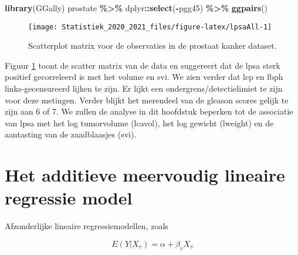 \documentclass[
  12pt,dutch,coursenotes]{book}
\newenvironment{Shaded}{\begin{snugshade}}{\end{snugshade}}
\newcommand{\KeywordTok}[1]{\textcolor[rgb]{0.13,0.29,0.53}{\textbf{#1}}}
\newcommand{\NormalTok}[1]{#1}
\newcommand{\OperatorTok}[1]{\textcolor[rgb]{0.81,0.36,0.00}{\textbf{#1}}}
\newcommand{\StringTok}[1]{\textcolor[rgb]{0.31,0.60,0.02}{#1}}
\theoremstyle{definition}
\theoremstyle{definition}
\theoremstyle{definition}
\theoremstyle{remark}
\begin{document}
\begin{Shaded}
\end{Shaded}

\begin{Shaded}
\begin{Highlighting}[]
\KeywordTok{library}\NormalTok{(GGally)}
\NormalTok{prostate }\OperatorTok{\%\textgreater{}\%}\StringTok{ }\NormalTok{dplyr}\OperatorTok{::}\KeywordTok{select}\NormalTok{(}\OperatorTok{{-}}\NormalTok{pgg45) }\OperatorTok{\%\textgreater{}\%}\StringTok{ }\KeywordTok{ggpairs}\NormalTok{()}
\end{Highlighting}
\end{Shaded}

\begin{figure}

{\centering \texttt{[image: Statistiek\_2020\_2021\_files/figure-latex/lpsaAll-1]} 

}

\caption{Scatterplot matrix voor de observaties in de prostaat kanker dataset.}\label{fig:lpsaAll}
\end{figure}

Figuur \ref{fig:lpsaAll} toont de scatter matrix van de data en suggereert dat de lpsa sterk positief gecorreleerd is met het volume en svi.
We zien verder dat lcp en lbph links-gecensureerd lijken te zijn. Er lijkt een ondergrens/detectielimiet te zijn voor deze metingen. Verder blijkt het merendeel van de gleason scores gelijk te zijn aan 6 of 7. We zullen de analyse in dit hoofdstuk beperken tot de associatie van lpsa met het log tumorvolume (lcavol), het log gewicht (lweight) en de aantasting van de zaadblaasjes (svi).

\hypertarget{het-additieve-meervoudig-lineaire-regressie-model}{%
\section{Het additieve meervoudig lineaire regressie model}\label{het-additieve-meervoudig-lineaire-regressie-model}}

Afzonderlijke lineaire regressiemodellen, zoals

\[E(Y|X_v)=\alpha+\beta_v X_v\]
\end{document}
